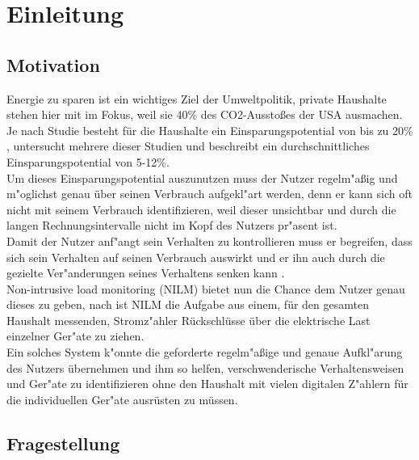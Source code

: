 \section{Einleitung}
\label{Einleitung}

\subsection{Motivation}
\label{Motivation}
	Energie zu sparen ist ein wichtiges Ziel der Umweltpolitik, private Haushalte stehen hier mit im Fokus, weil sie  40\% des CO2-Aussto{\ss}es 		\cite{vandenbergh2008individual} der USA ausmachen. \\
	Je nach Studie besteht für die Haushalte ein Einsparungspotential von bis zu 20\% \cite{armel2013disaggregation}, \cite{fischer2008feedback} untersucht mehrere dieser Studien und beschreibt ein durchschnittliches Einsparungspotential von 5-12\%.\\
	Um dieses Einsparungspotential auszunutzen muss der Nutzer regelm"a{\ss}ig und m"oglichst genau {\"u}ber seinen Verbrauch aufgekl"art werden, 	%
	denn er kann sich oft nicht mit seinem Verbrauch identifizieren, weil dieser unsichtbar und durch die langen Rechnungsintervalle nicht im Kopf des Nutzers pr"asent ist. \\
	Damit der Nutzer anf"angt sein Verhalten zu kontrollieren muss er begreifen, dass sich sein Verhalten auf seinen Verbrauch auswirkt und er ihn auch durch die gezielte Ver"anderungen seines Verhaltens senken kann \cite{fischer2008feedback}.\\
	Non-intrusive load monitoring (NILM) bietet nun die Chance dem Nutzer genau dieses zu geben, nach \cite{kolter2011redd} ist NILM die Aufgabe 	aus einem, für den gesamten Haushalt messenden, Stromz"ahler R{\"u}ckschl{\"u}sse über die elektrische Last einzelner Ger"ate zu ziehen. \\
	Ein solches System k"onnte die geforderte regelm"a{\ss}ige und genaue Aufkl"arung des Nutzers {\"u}bernehmen und ihm so helfen, verschwenderische Verhaltensweisen und Ger"ate zu identifizieren ohne den Haushalt mit vielen digitalen Z"ahlern für die individuellen Ger"ate ausr{\"u}sten zu m{\"u}ssen.

\subsection{Fragestellung}
\label{Fragestellung}



